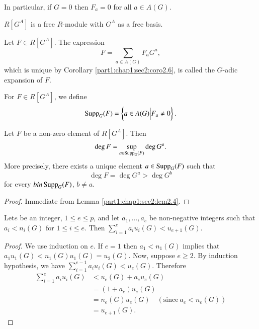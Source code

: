 In particular, if $G=0$ then $F_a =0$ for all $a \in A (G)$.

\begin{coro}\label{part1:chap1:sec2:coro2.6}
  $R[G^A]$ is a free $R$-module with $G^A$ as a free basis.
\end{coro}

\begin{defi}\label{part1:chap1:sec2:def2.7}
  Let $F \in R [G^A]$. The expression
  $$
  F = \sum_{a \in A (G)} F_a G^a,
  $$
  which is unique by Corollary \ref{part1:chap1:sec2:coro2.6}, is called the $G$-adic expansion of $F$. 
\end{defi}

\begin{defi}\label{part1:chap1:sec2:def2.8}
  For $F \in R [G^A]$, we define
  $$
  \operatorname{Supp}_G (F) = \left\{ a \in A (G) \Big| F_a \neq 0\right\}.
  $$
\end{defi}

\begin{coro}\label{part1:chap1:sec2:coro2.9}
  Let $F$ be a non-zero element of $R [G^A]$. Then 
  $$
  \deg F = \sup\limits_{a \in \operatorname{Supp}_G (F)} \deg G^a.
  $$
  More precisely, there exists a unique element $a \in \operatorname{Supp}_G (F)$ such that 
  $$
  \deg F = \deg G^a > \deg G^b
  $$
for every $b in \operatorname{Supp}_G (F)$, $b \neq a$.
\end{coro}

\begin{proof}
  Immediate from Lemma \ref{part1:chap1:sec2:lem2.4}.
\end{proof}

\begin{lemma}\label{part1:chap1:sec2:lem2.10}
  Let\pageoriginale $e$ be an integer, $1 \leq e \leq p$, and let $a_1 , \ldots , a_e$ be non-negative integers such that $a_i < n_i (G)$ for $1 \leq i \leq e$. Then $\displaystyle{\sum^e_{i=1}} a_i u_i (G)< u_{e+1} (G)$.
\end{lemma}

\begin{proof}
  We use induction on $e$. If $e=1$ then $a_1 < n_1 (G)$ implies that $a_1 u_1 (G) < n_1 (G) u_1 (G) = u_2(G)$. Now, suppose $e\geq 2$. By induction hypothesis, we have $\displaystyle{\sum^{e-1}_{i=1}} a_i u_i (G) < u_e (G)$. Therefore
\begin{align*}
  \sum^e_{i=1} a_i u_i (G) & < u_e (G) + a_e u_e (G)\\
  & = (1+ a_e) u_e (G)\\
  & = n_e (G) u_e (G) \quad (\text{since}~ a_e < n_e (G))\\
  &= u_{e+1} (G).
\end{align*}
\end{proof}

